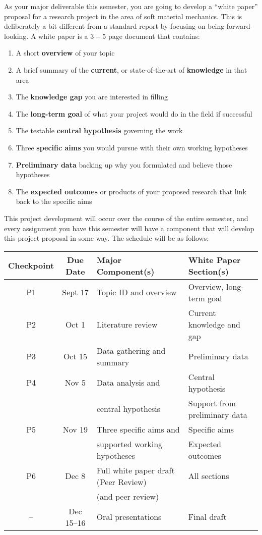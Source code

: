 \documentclass[preprint,12pt,authoryear]{elsarticle}
\begin{document}
As your major deliverable this semester, you are going to develop a ``white paper'' proposal for a research project in the area of soft material mechanics. 
This is deliberately a bit different from a standard report by focusing on being forward-looking. 
A white paper is a $3-5$ page document that contains:
\begin{enumerate}
    \item A short \textbf{overview} of your topic
    \item A brief summary of the \textbf{current}, or state-of-the-art of \textbf{knowledge} in that area
    \item The \textbf{knowledge gap} you are interested in filling
    \item The \textbf{long-term goal} of what your project would do in the field if successful
    \item The testable \textbf{central hypothesis} governing the work
    \item Three \textbf{specific aims} you would pursue with their own working hypotheses
    \item \textbf{Preliminary data} backing up why you formulated and believe those hypotheses
    \item The \textbf{expected outcomes} or products of your proposed research that link back to the specific aims  
\end{enumerate}

This project development will occur over the course of the entire semester, and every assignment you have this semester will have a component that will develop this project proposal in some way. 
The schedule will be as follows:
\smallskip

\footnotesize
\begin{tabularx}{\textwidth}{ccXX}

\textbf{Checkpoint} & \textbf{Due Date} & \textbf{Major Component(s)} & \textbf{White Paper Section(s)} \\
\hline
\hline
P1 & Sept 17 & Topic ID and overview & Overview, long-term goal \\
\hline
P2 & Oct 1 & Literature review & Current knowledge and gap \\
\hline
P3 & Oct 15 & Data gathering and summary & Preliminary data \\
\hline
P4 & Nov 5 & Data analysis and & Central hypothesis \\
 &  & central hypothesis & Support from preliminary data \\
\hline
P5 & Nov 19 & Three specific aims and & Specific aims \\
 & & supported working hypotheses & Expected outcomes \\
\hline
P6 & Dec 8 & Full white paper draft (Peer Review) & All sections \\
 &  & (and peer review) &  \\
\hline
-- & Dec 15--16 & Oral presentations & Final draft \\
\hline
\end{tabularx}
\normalsize
\end{document}
